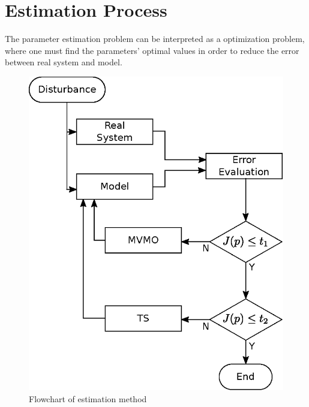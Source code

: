\chapter{Estimation Process}

\label{ch: Estim}

The parameter estimation problem can be interpreted as a optimization problem, where one must find the parameters' optimal values in order to reduce the error between real system and model.

\begin{figure}[h]
	\caption{Flowchart of estimation method}
	\begin{center}
		\includegraphics[scale=0.7]{Images/Flowchart.eps}
	\end{center}
	\label{fig: flowchart}
\end{figure}
